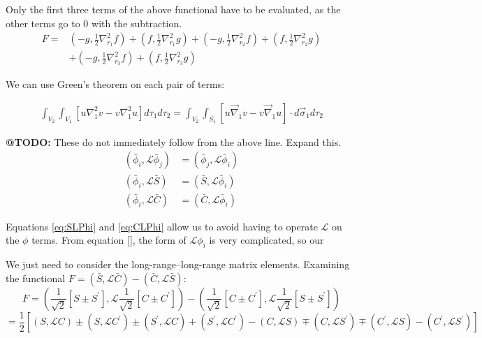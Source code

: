\documentclass[Dissertation.tex]{subfiles}
\begin{document}
Only the first three terms of the above functional have to be evaluated, as the other terms go to 0 with the subtraction.
\begin{align}
	F=&\left({-g,\frac{1}{2} \nabla_{r_1}^2 f}\right)+\left({f,\frac{1}{2} \nabla_{r_1}^2 g}\right)+
	\left({-g,\frac{1}{2} \nabla_{r_2}^2 f}\right)+\left({f,\frac{1}{2} \nabla_{r_2}^2 g}\right) \nonumber \\
	&+\left({-g,\frac{1}{2} \nabla_{r_3}^2 f}\right)+\left({f,\frac{1}{2} \nabla_{r_3}^2 g}\right)
\end{align}

We can use Green's theorem on each pair of terms:


\begin{align}
	{\int _{V_2}{{\int_{V_1}{\left[{u{\nabla }_1^2 v-v{\nabla }_1^2 u}\right]{d \tau_1}}}{d \tau_2}}}
	= \int_{V_2} \int_{S_1} \left[u \vec{\nabla}_1 v - v \vec{\nabla}_1 u \right] \cdot d\vec{\sigma}_1 d\tau_2
\end{align}

\textbf{@TODO:} These do not immediately follow from the above line. Expand this.
\begin{subequations}
\label{eq:elem_symm}
\begin{align}
\left(\bar{\phi}_i, \mathcal{L} \bar{\phi}_j \right) &= \left(\bar{\phi}_j, \mathcal{L} \bar{\phi}_i \right) \\
\left(\bar{\phi}_i, \mathcal{L} \bar{S} \right) &= \left(\bar{S}, \mathcal{L} \bar{\phi}_i \right) \label{eq:SLPhi} \\
\left(\bar{\phi}_i, \mathcal{L} \bar{C} \right) &= \left(\bar{C}, \mathcal{L} \bar{\phi}_i \right) \label{eq:CLPhi}
\end{align}
\end{subequations}

\noindent Equations \ref{eq:SLPhi} and \ref{eq:CLPhi} allow us to avoid having to operate $\mathcal{L}$ on the $\phi$ terms. From equation \ref{}, the form of $\mathcal{L}\phi_i$ is very complicated, so our 

We just need to consider the long-range--long-range matrix elements. Examining the functional
 $F = \left(\bar{S}, \mathcal{L}\bar{C}\right) - \left(\bar{C}, \mathcal{L}\bar{S}\right)$:
\begin{equation*}
F = \left(\frac{1}{\sqrt{2}} \left[S \pm S^\prime \right], \mathcal{L} \frac{1}{\sqrt{2}}\left[C \pm C^\prime \right] \right) -
    \left(\frac{1}{\sqrt{2}} \left[C \pm C^\prime \right], \mathcal{L} \frac{1}{\sqrt{2}}\left[S \pm S^\prime \right] \right)
\end{equation*}
\begin{equation}
= \frac{1}{2}\left[(S,\mathcal{L}C) \pm (S,\mathcal{L}C^\prime) \pm (S^\prime,\mathcal{L}C) + (S^\prime,\mathcal{L}C^\prime) - (C,\mathcal{L}S) \mp (C,\mathcal{L}S^\prime) \mp (C^\prime,\mathcal{L}S) - (C^\prime,\mathcal{L}S^\prime)\right]
\end{equation}
\end{document}
